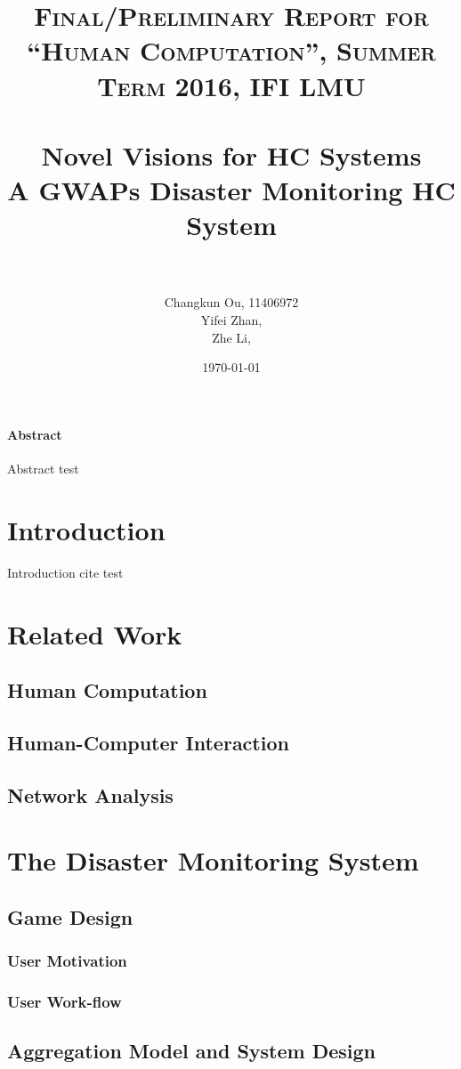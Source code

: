 \documentclass[paper=a4, fontsize=11pt]{scrartcl} %
\title{	
\normalfont \normalsize 
\textsc{Final/Preliminary Report for ``Human Computation'', Summer Term 2016, IFI LMU} \\ [25pt] %
\horrule{0.5pt} \\[0.4cm] %
\huge Novel Visions for HC Systems \\
A GWAPs Disaster Monitoring HC System \\
\horrule{2pt} \\[0.5cm] %
}
\author{
	Changkun Ou, 11406972 \\
	Yifei Zhan,  \\ 
	Zhe Li,      \\ 
} %
\date{\today} %
\numberwithin{equation}{section} %
\numberwithin{figure}{section} %
\numberwithin{table}{section} %
\begin{document}
\maketitle %

\tableofcontents

\paragraph{Abstract}

Abstract test

\section{Introduction}
Introduction cite test \cite{Bry2013} 

\section{Related Work}
  \subsection{Human Computation}
  \subsection{Human-Computer Interaction}
  \subsection{Network Analysis}

\section{The Disaster Monitoring System}

  \subsection{Game Design}
    \subsubsection{User Motivation}
    \subsubsection{User Work-flow}

  \subsection{Aggregation Model and System Design}
\end{document}
